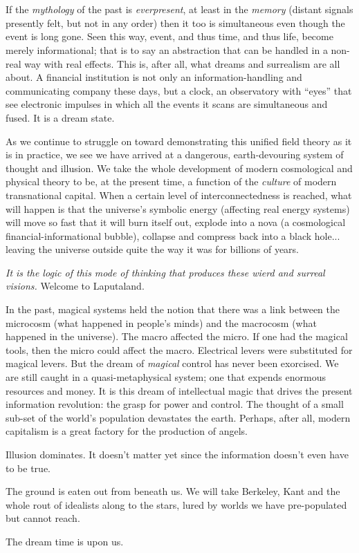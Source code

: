 \chapter{}

If the \emph{mythology} of the past is \emph{everpresent}, at least in the \emph{memory} (distant signals presently felt, but not in any order) then it too is simultaneous even though the event is long gone. Seen this way, event, and thus time, and thus life, become merely informational; that is to say an abstraction that can be handled in a non-real way with real effects. This is, after all, what dreams and surrealism are all about. A financial institution is not only an information-handling and communicating company these days, but a clock, an observatory with \enquote{eyes} that see electronic impulses in which all the events it scans are simultaneous and fused. It is a dream state.

As we continue to struggle on toward demonstrating this unified field theory as it is in practice, we see we have arrived at a dangerous, earth-devouring system of thought and illusion. We take the whole development of modern cosmological and physical theory to be, at the present time, a function of the \emph{culture} of modern transnational capital. When a certain level of interconnectedness is reached, what will happen is that the universe's symbolic energy (affecting real energy systems) will move so fast that it will burn itself out, explode into a nova (a cosmological financial-informational bubble), collapse and compress back into a black hole... leaving the universe outside quite the way it was for billions of years.

\emph{It is the logic of this mode of thinking that produces these wierd and surreal visions.} Welcome to Laputaland.

In the past, magical systems held the notion that there was a link between the microcosm (what happened in people's minds) and the macrocosm (what happened in the universe). The macro affected the micro. If one had the magical tools, then the micro could affect the macro. Electrical levers were substituted for magical levers. But the dream of \emph{magical} control has never been exorcised. We are still caught in a quasi-metaphysical system; one that expends enormous resources and money. It is this dream of intellectual magic that drives the present information revolution: the grasp for power and control. The thought of a small sub-set of the world's population devastates the earth. Perhaps, after all, modern capitalism is a great factory for the production of angels.

Illusion dominates. It doesn't matter yet since the information doesn't even have to be true.

The ground is eaten out from beneath us. We will take Berkeley, Kant and the whole rout of idealists along to the stars, lured by worlds we have pre-populated but cannot reach.

The dream time is upon us.
